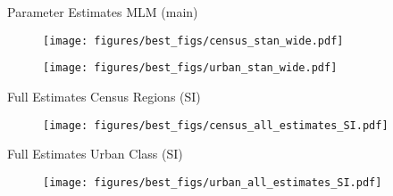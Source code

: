 \documentclass[pdf]{beamer}
\begin{document}

\begin{frame}{Parameter Estimates MLM (main)}

\vspace{-0.4cm}

\begin{figure}[ht]
\begin{center}
\texttt{[image: figures/best\_figs/census\_stan\_wide.pdf]}
\end{center}
\end{figure}

\vspace{-0.8cm}

\begin{figure}[ht]
\begin{center}
\texttt{[image: figures/best\_figs/urban\_stan\_wide.pdf]}
\end{center}
\end{figure}

\end{frame}


\begin{frame}{Full Estimates Census Regions (SI)}
\begin{figure}[ht]
\begin{center}
\texttt{[image: figures/best\_figs/census\_all\_estimates\_SI.pdf]}
\end{center}
\end{figure}
\end{frame}


\begin{frame}{Full Estimates Urban Class (SI)}
\begin{figure}[ht]
\begin{center}
\texttt{[image: figures/best\_figs/urban\_all\_estimates\_SI.pdf]}
\end{center}
\end{figure}
\end{frame}

 
\end{document}
